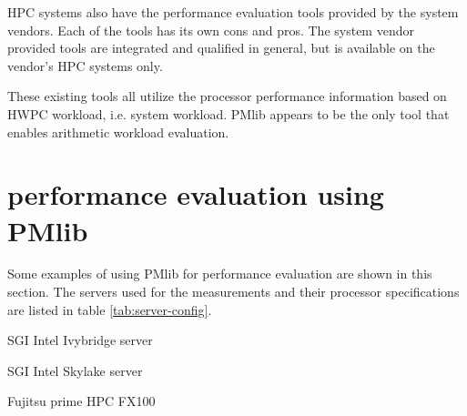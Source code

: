 \documentclass[conference]{IEEEtran}
\begin{document}
HPC systems also have the performance evaluation tools provided by the
system vendors.
Each of the tools has its own cons and pros.
The system vendor provided tools are integrated and qualified in general,
but is available on the vendor's HPC systems only.

These existing tools all utilize the processor performance information
based on HWPC workload, i.e. system workload.
PMlib appears to be the only tool that enables arithmetic workload evaluation.


\section{performance evaluation using PMlib}
\label{section:using-PMlib}

Some examples of using PMlib for performance evaluation are shown in this
section.
The servers used for the measurements and their processor specifications
are listed in table \ref{tab:server-config}.
\begin{itemize}
{
\item SGI Intel Ivybridge server
\item SGI Intel Skylake server
\item Fujitsu prime HPC FX100
}
\end{itemize}
\end{document}
